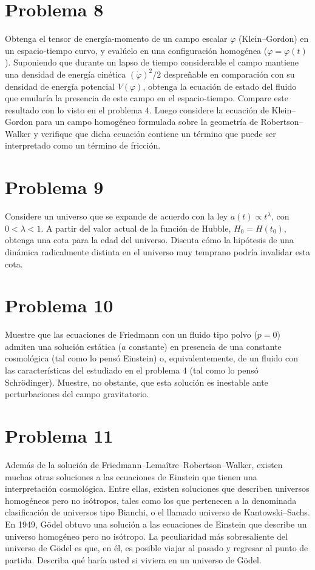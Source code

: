 \documentclass[11pt,a4paper]{article}
\begin{document}
\section*{Problema 8}
Obtenga el tensor de energía-momento de un campo escalar $\varphi$ (Klein--Gordon) en un espacio-tiempo curvo, y evalúelo en una configuración homogénea ($\varphi=\varphi(t)$). Suponiendo que durante un lapso de tiempo considerable el campo mantiene una densidad de energía cinética $(\dot\varphi)^2/2$ despreñable en comparación con su densidad de energía potencial $V(\varphi)$, obtenga la ecuación de estado del fluido que emularía la presencia de este campo en el espacio-tiempo. Compare este resultado con lo visto en el problema 4. Luego considere la ecuación de Klein--Gordon para un campo homogéneo formulada sobre la geometría de Robertson--Walker y verifique que dicha ecuación contiene un término que puede ser interpretado como un término de fricción.

\section*{Problema 9}
Considere un universo que se expande de acuerdo con la ley $a(t)\propto t^{\lambda}$, con $0<\lambda<1$. A partir del valor actual de la función de Hubble, $H_0=H(t_0)$, obtenga una cota para la edad del universo. Discuta cómo la hipótesis de una dinámica radicalmente distinta en el universo muy temprano podría invalidar esta cota.

\section*{Problema 10}
Muestre que las ecuaciones de Friedmann con un fluido tipo polvo ($p=0$) admiten una solución estática ($a$ constante) en presencia de una constante cosmológica (tal como lo pensó Einstein) o, equivalentemente, de un fluido con las características del estudiado en el problema 4 (tal como lo pensó Schrödinger). Muestre, no obstante, que esta solución es inestable ante perturbaciones del campo gravitatorio.

\section*{Problema 11}
Además de la solución de Friedmann--Lemaître--Robertson--Walker, existen muchas otras soluciones a las ecuaciones de Einstein que tienen una interpretación cosmológica. Entre ellas, existen soluciones que describen universos homogéneos pero no isótropos, tales como los que pertenecen a la denominada clasificación de universos tipo Bianchi, o el llamado universo de Kantowski--Sachs. En 1949, Gödel obtuvo una solución a las ecuaciones de Einstein que describe un universo homogéneo pero no isótropo. La peculiaridad más sobresaliente del universo de Gödel es que, en él, es posible viajar al pasado y regresar al punto de partida. Describa qué haría usted si viviera en un universo de Gödel.
\end{document}
